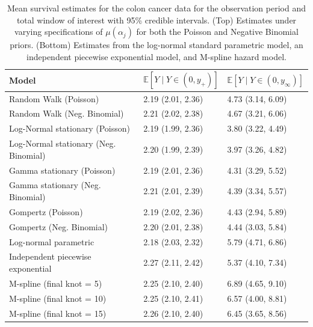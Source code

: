 \documentclass[ba,preprint]{imsart}
\theoremstyle{plain}
\theoremstyle{definition}
\theoremstyle{remark}
\begin{document}
\begin{table}[]
    \centering
    \begin{tabular}{l|l|l}
       Model   & {\color{red}$\mathbb{E}[Y\mid Y \in (0,y_+)]$} & {\color{red}$\mathbb{E}[Y\mid Y \in (0,y_\infty)]$} \\
       \hline
        Random Walk (Poisson)     & 2.19 (2.01, 2.36) & 4.73 (3.14, 6.09) \\
        Random Walk (Neg. Binomial)    & 2.21 (2.02, 2.38) & 4.67 (3.21, 6.06) \\
        Log-Normal stationary (Poisson) & 2.19 (1.99, 2.36) &  3.80 (3.22,  4.49) \\
        Log-Normal stationary (Neg. Binomial) & 2.20 (1.99, 2.39) & 3.97 (3.26, 4.82) \\
        Gamma stationary (Poisson)         & 2.19 (2.01, 2.36) & 4.31 (3.29, 5.52) \\
        Gamma stationary (Neg. Binomial)   & 2.21 (2.01, 2.39) & 4.39 (3.34, 5.57) \\
        Gompertz (Poisson)         & 2.19 (2.02, 2.36) & 4.43 (2.94, 5.89) \\
        Gompertz (Neg. Binomial)   & 2.20 (2.01, 2.38)  &  4.44 (3.03, 5.84) \\
        \hline
        Log-normal parametric   &  2.18 (2.03, 2.32) & 5.79 (4.71, 6.86) \\
        Independent piecewise exponential     & 2.27 (2.11, 2.42) & 5.37 (4.10, 7.34) \\
        M-spline (final knot = 5) & 2.25  (2.10, 2.40) & 6.89 (4.65, 9.10)\\
        M-spline (final knot = 10) & 2.25 (2.10, 2.41) &  6.57 (4.00, 8.81) \\
        M-spline (final knot = 15) & 2.26 (2.10, 2.40)  & 6.45 (3.65, 8.56) \\
        \hline
    \end{tabular}
    \caption{Mean survival estimates for the colon cancer data for the observation period and total window of interest with 95\% credible intervals. (Top) Estimates under varying specifications of $\mu(\alpha_j)$ for both the Poisson and Negative Binomial priors. (Bottom) Estimates from the log-normal standard parametric model, an independent piecewise exponential model, and M-spline hazard model.}
    \label{tab:Colon}
\end{table}
\end{document}
